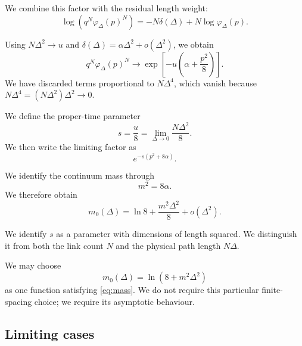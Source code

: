 \documentclass[11pt,a4paper]{article}
\numberwithin{equation}{section}
\begin{document}
We combine this factor with the residual
length weight:
\begin{equation}
    \log\left(q^N\varphi_\Delta(p)^N\right)
    =
    -N\delta(\Delta)
    +N\log\varphi_\Delta(p).
\end{equation}

Using $N\Delta^2\to u$ and
$\delta(\Delta)=\alpha\Delta^2+o(\Delta^2)$, we obtain
\begin{equation}
    q^N\varphi_\Delta(p)^N
    \longrightarrow
    \exp\left[-u\left(\alpha+\frac{p^2}{8}\right)\right].
\end{equation}
We have discarded terms proportional to
$N\Delta^4$, which vanish because
$N\Delta^4=(N\Delta^2)\Delta^2\to0$.

We define the proper-time parameter
\begin{equation}
    s=\frac{u}{8}
    =
    \lim_{\Delta\to0}\frac{N\Delta^2}{8}.
\end{equation}
We then write the limiting factor as
\begin{equation}
    e^{-s(p^2+8\alpha)}.
\end{equation}

We identify the continuum mass through
\begin{equation}
    m^2=8\alpha.
\end{equation}
We therefore obtain
\begin{equation}
    \boxed{
    m_0(\Delta)
    =
    \ln8+\frac{m^2\Delta^2}{8}+o(\Delta^2).
    }
    \label{eq:mass}
\end{equation}

We identify $s$ as a parameter with dimensions
of length squared. We distinguish it from both
the link count $N$ and the physical path length
$N\Delta$.

We may choose
\begin{equation}
    m_0(\Delta)=\ln(8+m^2\Delta^2)
\end{equation}
as one function satisfying \eqref{eq:mass}.
We do not require this particular finite-spacing
choice; we require its asymptotic behaviour.

\subsection{Limiting cases}
\end{document}
